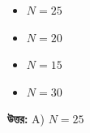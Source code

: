 \documentclass[12pt, a4paper]{article}
\begin{document}
\begin{itemize}[label={}, leftmargin=1cm, itemsep=0.5em]
\item[\textbf{A)}] $N = 25$
\item[\textbf{B)}] $N = 20$
\item[\textbf{C)}] $N = 15$
\item[\textbf{D)}] $N = 30$
\end{itemize}

\vspace{0.5em}
\begin{tcolorbox}[answerbox]
\textbf{\color{success} উত্তর:} A) $N = 25$
\end{tcolorbox}
\vspace{1em}
\end{document}
